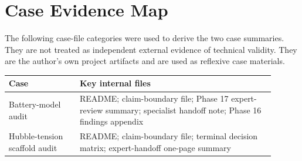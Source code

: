 \documentclass[a4paper,11pt]{article}
\begin{document}
\appendix
\section{Case Evidence Map}

The following case-file categories were used to derive the two case summaries. They are not treated as independent external evidence of technical validity. They are the author's own project artifacts and are used as reflexive case materials.

\begin{longtable}{p{0.24\linewidth}p{0.66\linewidth}}
\toprule
Case & Key internal files\\
\midrule
Battery-model audit & README; claim-boundary file; Phase 17 expert-review summary; specialist handoff note; Phase 16 findings appendix\\
Hubble-tension scaffold audit & README; claim-boundary file; terminal decision matrix; expert-handoff one-page summary\\
\bottomrule
\end{longtable}
\end{document}
